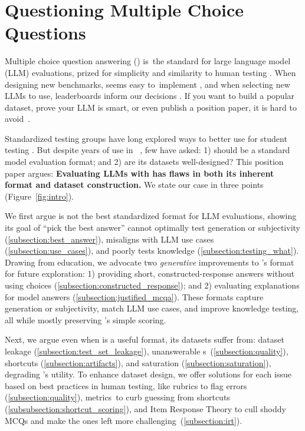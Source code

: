 \section{Questioning Multiple Choice Questions}

Multiple choice question answering (\mcqa) is~the standard for large language model (LLM) evaluations, prized for simplicity and
similarity to human testing \cite{robinson2023leveraging}.
%
When designing new benchmarks, \mcqa seems easy to~implement
\cite{guo2023evaluating}, and when selecting new LLMs to use, \mcqa
leaderboards inform our decisions \cite{open-llm-leaderboard-v2}.
%
If you want to build a popular dataset, prove your LLM is smart,
or even publish a position paper, it is hard to avoid~\mcqa.

Standardized testing groups have long explored ways to
better use \mcqa for student testing \cite{angoff1971college}.
But despite years of use in ~\cite{turney2003combining}, few have asked: 1) should \mcqa be a standard model evaluation format; and 2) are its datasets well-designed?
This position paper argues: \textbf{Evaluating LLMs with \mcqa has flaws in both its inherent format and dataset construction.}
We state our case in three points (Figure~\ref{fig:intro}).



We first argue \mcqa is not the best standardized format for LLM evaluations, showing its goal of ``pick the
best answer'' cannot optimally test generation or subjectivity
(\cref{subsection:best_answer}), misaligns with LLM use cases
(\cref{subsection:use_cases}), and poorly tests knowledge
(\cref{subsection:testing_what}).
Drawing from education, we advocate two \textit{generative}
improvements to \mcqa's format for future exploration: 1) providing
short, constructed-response answers without using choices
(\cref{subsection:constructed_response}); and 2) evaluating
explanations for model answers (\cref{subsection:justified_mcqa}).
%
These formats capture generation or subjectivity, match LLM use cases,
and improve knowledge testing, all while mostly preserving \mcqa's
simple scoring.


Next, we argue even when \mcqa is a useful format, its datasets suffer from: dataset leakage
(\cref{subsection:test_set_leakage}), unanswerable \mcq{}s~(\cref{subsection:quality}), shortcuts (\cref{subsection:artifacts}),
and saturation (\cref{subsection:saturation}), degrading \mcqa's utility.
%
To enhance  dataset design, we offer solutions for each issue based on best practices in human
testing, like rubrics to flag \mcq errors (\cref{subsection:quality}),
metrics~to curb guessing from shortcuts
(\cref{subsubsection:shortcut_scoring}), and Item Response Theory
\cite{baker2001basics} to cull shoddy MCQs and make the ones left
more challenging~(\cref{subsection:irt}).

